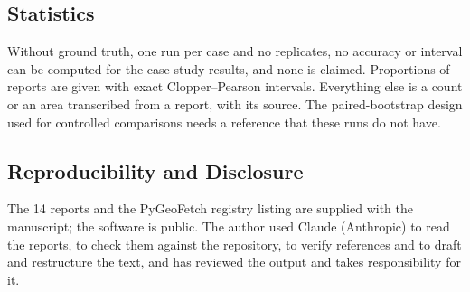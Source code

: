 \documentclass[conference]{IEEEtran}
\begin{document}
\subsection{Statistics}

Without ground truth, one run per case and no replicates, no accuracy or interval can be computed for the case-study results, and none is claimed. Proportions of reports are given with exact Clopper--Pearson intervals. Everything else is a count or an area transcribed from a report, with its source. The paired-bootstrap design used for controlled comparisons needs a reference that these runs do not have.

\subsection{Reproducibility and Disclosure}

The 14 reports and the PyGeoFetch registry listing are supplied with the manuscript; the software is public. The author used Claude (Anthropic) to read the reports, to check them against the repository, to verify references and to draft and restructure the text, and has reviewed the output and takes responsibility for it.
\end{document}
